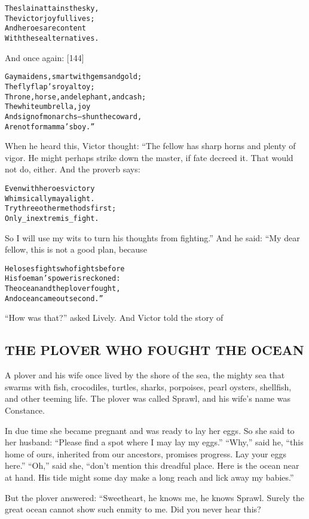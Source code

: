 \documentclass{article}
\renewenvironment{verbatim}{\begin{alltt}\normalfont\begin{centering}}{\end{centering}\end{alltt}}
\begin{document}
\begin{verbatim}
The slain attains the sky,
    The victor joyful lives;
And heroes are content
    With these alternatives.
\end{verbatim}
And once again: [144]

\begin{verbatim}
Gay maidens, smart with gems and gold;
    The flyflap's royal toy;
Throne, horse, and elephant, and cash;
    The white umbrella, joy
And sign of monarchs--shun the coward,
    Are not for mamma's boy.”
\end{verbatim}
When he heard this, Victor thought: “The fellow has sharp horns and
plenty of vigor. He might perhaps strike down the master, if fate
decreed it. That would not do, either. And the proverb says:

\begin{verbatim}
Even with heroes victory
    Whimsically may alight.
Try three other methods first;
    Only _in extremis_ fight.
\end{verbatim}
So I will use my wits to turn his thoughts from fighting.” And he
said: “My dear fellow, this is not a good plan, because

\begin{verbatim}
He loses fights who fights before
    His foeman's power is reckoned:
The ocean and the plover fought,
    And ocean came out second.”
\end{verbatim}
``How was that?'' asked Lively. And Victor told the story of

\subsection{THE PLOVER WHO FOUGHT THE OCEAN}

A plover and his wife once lived by the shore of the sea, the
mighty sea that swarms with fish, crocodiles, turtles, sharks,
porpoises, pearl oysters, shellfish, and other teeming life. The
plover was called Sprawl, and his wife's name was Constance.

In due time she became pregnant and was ready to lay her eggs. So
she said to her husband:
``Please find a spot where I may lay my eggs.'' ``Why,'' said he,
``this home of ours, inherited from our ancestors, promises progress. Lay your eggs here.''
``Oh,'' said she,
``don't mention this dreadful place. Here is the ocean near at hand. His tide might some day make a long reach and lick away my babies.''

But the plover answered: “Sweetheart, he knows me, he knows Sprawl.
Surely the great ocean cannot show such enmity to me. Did you never
hear this?
\end{document}
